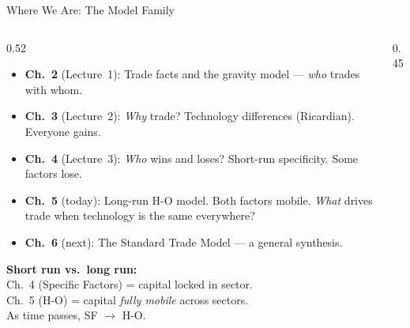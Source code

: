 \documentclass[aspectratio=169]{beamer}
\begin{document}
\begin{frame}[shrink=7]{Where We Are: The Model Family}
\begin{columns}[T]
\begin{column}{0.52\textwidth}
\begin{itemize}\small
  \item \textbf{Ch.~2} (Lecture~1): Trade facts and the
        gravity model --- \emph{who} trades with whom.
  \item \textbf{Ch.~3} (Lecture~2): \emph{Why} trade?
        Technology differences (Ricardian). Everyone gains.
  \item \textbf{Ch.~4} (Lecture~3): \emph{Who} wins and
        loses? Short-run specificity. Some factors lose.
  \item \textbf{Ch.~5} (today): Long-run H-O model.
        Both factors mobile. \emph{What} drives trade when
        technology is the same everywhere?
  \item \textbf{Ch.~6} (next): The Standard Trade Model
        --- a general synthesis.
\end{itemize}
\vspace{0.4em}
\begin{varbox}
\footnotesize\textbf{Short run vs.\ long run:}\\[0.2em]
Ch.~4 (Specific Factors) = capital locked in sector.\\
Ch.~5 (H-O) = capital \emph{fully mobile} across sectors.\\[0.2em]
As time passes, SF $\longrightarrow$ H-O.
\end{varbox}
\end{column}
\begin{column}{0.45\textwidth}
\end{column}
\end{columns}
\end{frame}
\end{document}
